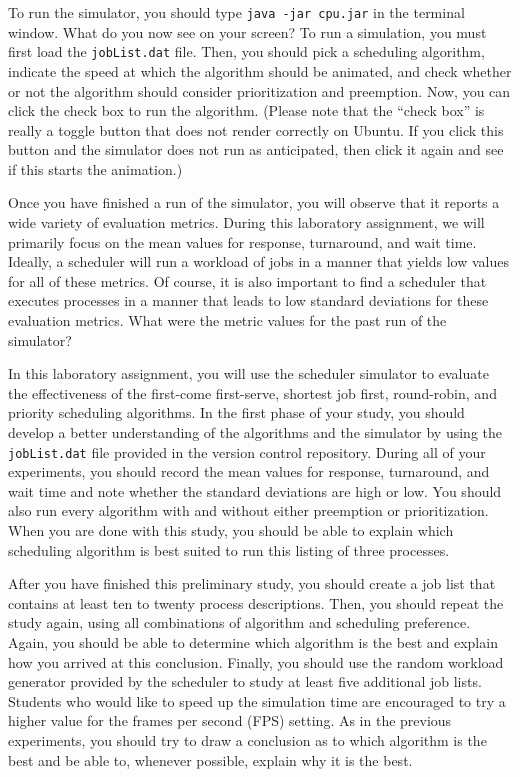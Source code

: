   To run the simulator, you should type {\tt java -jar cpu.jar} in the terminal window.  What do you now see on your
  screen? To run a simulation, you must first load the {\tt jobList.dat} file.  Then, you should pick a scheduling
  algorithm, indicate the speed at which the algorithm should be animated, and check whether or not the algorithm should
  consider prioritization and preemption. Now, you can click the check box to run the algorithm. (Please note that the
  ``check box'' is really a toggle button that does not render correctly on Ubuntu. If you click this button and the
  simulator does not run as anticipated, then click it again and see if this starts the animation.)

  Once you have finished a run of the simulator, you will observe that it reports a wide variety of evaluation
  metrics. During this laboratory assignment, we will primarily focus on the mean values for response, turnaround, and
  wait time. Ideally, a scheduler will run a workload of jobs in a manner that yields low values for all of these
  metrics. Of course, it is also important to find a scheduler that executes processes in a manner that leads to
  low standard deviations for these evaluation metrics. What were the metric values for the past run of the simulator?

  In this laboratory assignment, you will use the scheduler simulator to evaluate the effectiveness of the first-come
  first-serve, shortest job first, round-robin, and priority scheduling algorithms.  In the first phase of your study,
  you should develop a better understanding of the algorithms and the simulator by using the {\tt jobList.dat} file
  provided in the version control repository. During all of your experiments, you should record the mean values for
  response, turnaround, and wait time and note whether the standard deviations are high or low. You should also run
  every algorithm with and without either preemption or prioritization. When you are done with this study, you should be
  able to explain which scheduling algorithm is best suited to run this listing of three processes. 

  After you have finished this preliminary study, you should create a job list that contains at least ten to twenty
  process descriptions.  Then, you should repeat the study again, using all combinations of algorithm and scheduling 
  preference.  Again, you should be able to determine which algorithm is the best and explain how you arrived at this
  conclusion. Finally, you should use the random workload generator provided by the scheduler to study at least five
  additional job lists. Students who would like to speed up the simulation time are encouraged to try a higher value for
  the frames per second (FPS) setting. As in the previous experiments, you should try to draw a conclusion as to which
  algorithm is the best and be able to, whenever possible, explain why it is the best.

